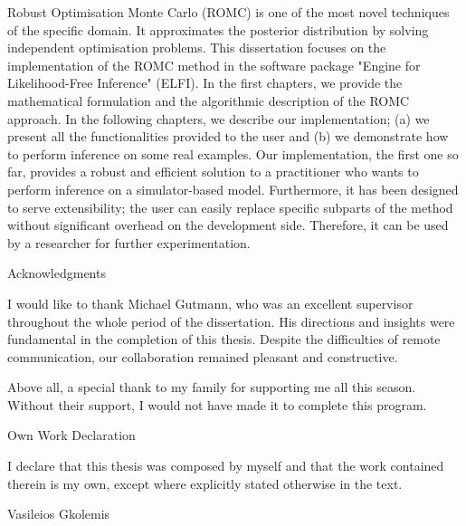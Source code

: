 \documentclass[11pt,twoside]{article}
\numberwithin{Theorem}{section}
\numberwithin{Definition}{section}
\numberwithin{Lemma}{section}
\numberwithin{Algorithm}{section}
\numberwithin{equation}{section}
\begin{document}
Robust Optimisation Monte Carlo (ROMC) is one of the most novel
techniques of the specific domain. It approximates the posterior
distribution by solving independent optimisation problems. This
dissertation focuses on the implementation of the ROMC method in the
software package "Engine for Likelihood-Free Inference" (ELFI). In the
first chapters, we provide the mathematical formulation and the
algorithmic description of the ROMC approach. In the following
chapters, we describe our implementation; (a) we present all the
functionalities provided to the user and (b) we demonstrate how to
perform inference on some real examples.  Our implementation, the
first one so far, provides a robust and efficient solution to a
practitioner who wants to perform inference on a simulator-based
model. Furthermore, it has been designed to serve extensibility; the
user can easily replace specific subparts of the method without
significant overhead on the development side. Therefore, it can be
used by a researcher for further experimentation.



\clearpage

\begin{center}
\Large{Acknowledgments}
\end{center}

I would like to thank Michael Gutmann, who was an excellent supervisor
throughout the whole period of the dissertation.  His directions and
insights were fundamental in the completion of this thesis. Despite
the difficulties of remote communication, our collaboration remained
pleasant and constructive.

Above all, a special thank to my family for supporting me all this
season. Without their support, I would not have made it to complete
this program.

\clearpage

\begin{center}
\Large{Own Work Declaration}
\end{center}

\hfill

I declare that this thesis was composed by myself and that
the work contained therein is my own, except where explicitly stated
otherwise in the text.

\hfill

\hfill

Vasileios Gkolemis
\cleardoublepage



\pagestyle{plain}
\setcounter{page}{1}
\end{document}
